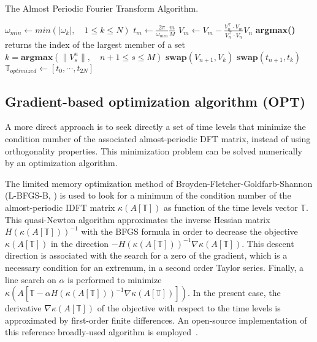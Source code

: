 \begin{algorithm}[htb]
\caption{The Almost Periodic Fourier Transform Algorithm.}
\label{alg:algo_APFT}
\begin{algorithmic}
\STATE $\omega_{min} \leftarrow min \left( |\omega_k |,\quad 1 \leqslant k \leqslant N \right)$
    \STATE $t_m \leftarrow \displaystyle\frac{2\pi}{\omega_{min}}\frac{m}{M}$
\ENDFOR
{}
  \STATE $ V_{m} \leftarrow V_{m} - \displaystyle\frac{V_{n}^\top \cdot V_{m}}{V_{n}^\top \cdot V_{n}} V_{n}$
   \ENDFOR
   \STATE \textbf{argmax()} returns the index of the largest member of a set
   \STATE $k=\textbf{argmax} \left( \| V_s^n \|,\quad n+1\leqslant s \leqslant M\right) $
   \STATE $\textbf{swap}(V_{n+1},V_{k})$
   \STATE $\textbf{swap}(t_{n+1},t_{k})$
\ENDFOR
\STATE $\mathbb{T}_{optimized} \leftarrow [t_0, \cdots, t_{2N}]$
\end{algorithmic}
\end{algorithm}

\subsection{Gradient-based optimization algorithm (OPT)}
A more direct approach is to seek directly a set of time levels
that minimize the condition number of the associated almost-periodic DFT matrix, 
instead of using orthogonality properties. 
This minimization problem can be solved numerically by 
an optimization algorithm. %

The limited memory optimization method of
Broyden-Fletcher-Goldfarb-Shannon (L-BFGS-B, \cite{Byrd94alimited}) is
used to look for a minimum of the condition number of the
almost-periodic IDFT matrix $\kappa \left(A \left[\mathbb{T} \right]
\right)$ as function of the time levels vector $\mathbb{T}$.  This
quasi-Newton algorithm approximates the inverse Hessian matrix
$H(\kappa \left(A \left[\mathbb{T} \right] \right))^{-1}$ with the
BFGS formula in order to decrease the objective $\kappa \left(A
  \left[\mathbb{T} \right] \right)$ in the direction $-H(\kappa
\left(A \left[\mathbb{T} \right] \right))^{-1}\nabla \kappa \left(A
  \left[\mathbb{T} \right] \right)$.  This descent direction is
associated with the search for a zero of the gradient, which is a
necessary condition for an extremum, in a second order Taylor series.
Finally, a line search on $\alpha$ is performed to minimize $\kappa
\left(A \left[\mathbb{T} - \alpha H(\kappa \left(A \left[\mathbb{T}
      \right] \right))^{-1} \nabla \kappa \left(A \left[\mathbb{T}
      \right] \right) \right] \right)$.  In the present case, the
derivative $\nabla \kappa \left(A \left[\mathbb{T} \right] \right)$ of
the objective with respect to the time levels is approximated by
first-order finite differences.  An open-source implementation of this
reference broadly-used algorithm is
employed~\cite{Nocedal97lbfgsb}.

